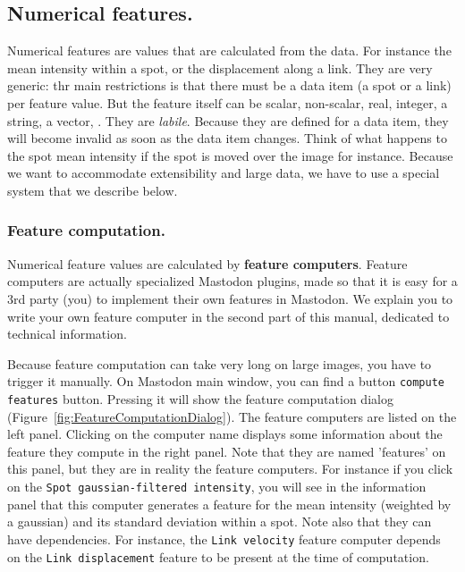 \subsection{Numerical features.}

Numerical features are values that are calculated from the data.
For instance the mean intensity within a spot, or the displacement along a link.
They are very generic: thr main restrictions is that there must be a data item (a spot or a link) per feature value. 
But the feature itself can be scalar, non-scalar, real, integer, a string, a vector, 
\etc.
They are \textit{labile}. 
Because they are defined for a data item, they will become invalid as soon as the data item changes.
Think of what happens to the spot mean intensity if the spot is moved over the image for instance.
Because we want to accommodate extensibility and large data, we have to use a special system that we describe below. 

\subsubsection{Feature computation.}

Numerical feature values are calculated by \textbf{feature computers}.
Feature computers are actually specialized Mastodon plugins, made so that it is easy for a 3rd party (you) to implement their own features in Mastodon.
We explain you to write your own feature computer in the second part of this manual, dedicated to technical information.

Because feature computation can take very long on large images, you have to trigger it manually.
On Mastodon main window, you can find a button \texttt{compute features} button.
Pressing it will show the feature computation dialog (Figure~\ref{fig:FeatureComputationDialog}).
The feature computers are listed on the left panel.
Clicking on the computer name displays some information about the feature they compute in the right panel. 
Note that they are named 'features' on this panel, but they are in reality the feature computers.
For instance if you click on the \texttt{Spot gaussian-filtered intensity}, you will see in the information panel that this computer generates a feature for the mean intensity (weighted by a gaussian) and its standard deviation within a spot.
Note also that they can have dependencies.
For instance, the \texttt{Link velocity} feature computer depends on the \texttt{Link displacement} feature to be present at the time of computation.

